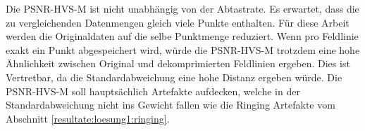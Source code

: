 Die PSNR-HVS-M ist nicht unabhängig von der Abtastrate. Es erwartet, dass die zu vergleichenden Datenmengen gleich viele Punkte enthalten. Für diese Arbeit werden die Originaldaten auf die selbe Punktmenge reduziert. Wenn pro Feldlinie exakt ein Punkt abgespeichert wird, würde die PSNR-HVS-M trotzdem eine hohe Ähnlichkeit zwischen Original und dekomprimierten Feldlinien ergeben. Dies ist Vertretbar, da die Standardabweichung eine hohe Distanz ergeben würde. Die PSNR-HVS-M soll hauptsächlich Artefakte aufdecken, welche in der Standardabweichung nicht ins Gewicht fallen wie die Ringing Artefakte vom Abschnitt \ref{resultate:loesung1:ringing}.